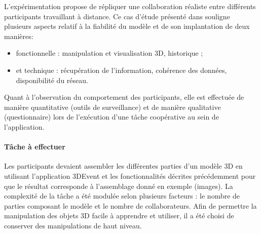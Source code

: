 L'expérimentation propose de répliquer une collaboration réaliste entre différents 
participants travaillant à distance. Ce cas d'étude présenté dans 
\cite{Desprat2017} souligne plusieurs aspects relatif à la fiabilité du modèle et de 
son implantation de deux manières: 
\begin{itemize}
	\item fonctionnelle : manipulation et visualisation 
	3D, historique ;
	\item et technique : récupération de l'information, cohérence des 
	données, disponibilité du réseau.
\end{itemize}

Quant à l'observation du comportement des participants, elle est 
effectuée de manière quantitative (outils de surveillance) et de manière qualitative 
(questionnaire) lors de l'exécution d'une tâche coopérative au sein de l'application.

\paragraph{Tâche à effectuer}
Les participants devaient assembler les différentes parties d'un modèle 3D en 
utilisant l'application 3DEvent et les fonctionnalités décrites précédemment 
 pour que le résultat corresponde à l'assemblage 
donné en exemple (images). La complexité de la tâche a été modulée selon 
plusieurs facteurs : le nombre de parties composant le modèle et le nombre de 
collaborateurs. Afin de permettre la manipulation des objets 3D facile à 
apprendre et utiliser, il a été choisi de conserver des manipulations de haut niveau.
